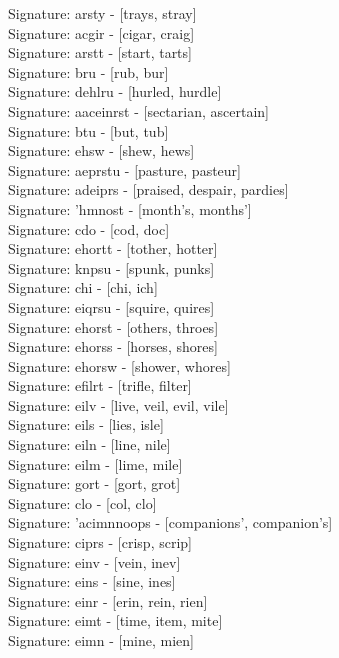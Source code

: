 Signature: {arsty} - [trays, stray] \\
Signature: {acgir} - [cigar, craig] \\
Signature: {arstt} - [start, tarts] \\
Signature: {bru} - [rub, bur] \\
Signature: {dehlru} - [hurled, hurdle] \\
Signature: {aaceinrst} - [sectarian, ascertain] \\
Signature: {btu} - [but, tub] \\
Signature: {ehsw} - [shew, hews] \\
Signature: {aeprstu} - [pasture, pasteur] \\
Signature: {adeiprs} - [praised, despair, pardies] \\
Signature: {'hmnost} - [month's, months'] \\
Signature: {cdo} - [cod, doc] \\
Signature: {ehortt} - [tother, hotter] \\
Signature: {knpsu} - [spunk, punks] \\
Signature: {chi} - [chi, ich] \\
Signature: {eiqrsu} - [squire, quires] \\
Signature: {ehorst} - [others, throes] \\
Signature: {ehorss} - [horses, shores] \\
Signature: {ehorsw} - [shower, whores] \\
Signature: {efilrt} - [trifle, filter] \\
Signature: {eilv} - [live, veil, evil, vile] \\
Signature: {eils} - [lies, isle] \\
Signature: {eiln} - [line, nile] \\
Signature: {eilm} - [lime, mile] \\
Signature: {gort} - [gort, grot] \\
Signature: {clo} - [col, clo] \\
Signature: {'acimnnoops} - [companions', companion's] \\
Signature: {ciprs} - [crisp, scrip] \\
Signature: {einv} - [vein, inev] \\
Signature: {eins} - [sine, ines] \\
Signature: {einr} - [erin, rein, rien] \\
Signature: {eimt} - [time, item, mite] \\
Signature: {eimn} - [mine, mien] \\
